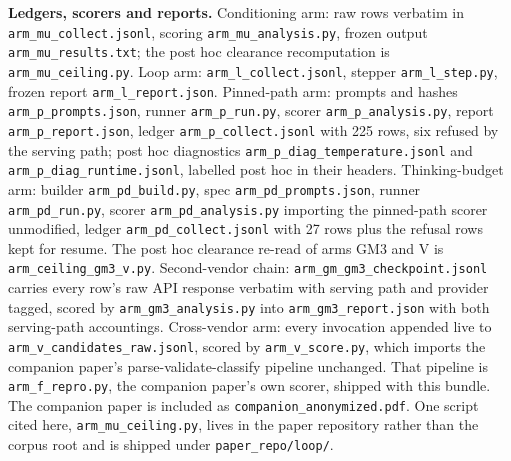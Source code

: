 \textbf{Ledgers, scorers and reports.} Conditioning arm: raw rows verbatim in
\texttt{arm\_mu\_collect.jsonl}, scoring \texttt{arm\_mu\_analysis.py}, frozen output
\texttt{arm\_mu\_results.txt}; the post hoc clearance recomputation is
\texttt{arm\_mu\_ceiling.py}. Loop arm: \texttt{arm\_l\_collect.jsonl}, stepper
\texttt{arm\_l\_step.py}, frozen report \texttt{arm\_l\_report.json}. Pinned-path arm:
prompts and hashes \texttt{arm\_p\_prompts.json}, runner \texttt{arm\_p\_run.py}, scorer
\texttt{arm\_p\_analysis.py}, report \texttt{arm\_p\_report.json}, ledger
\texttt{arm\_p\_collect.jsonl} with 225 rows, six refused by the serving path; post hoc
diagnostics \texttt{arm\_p\_diag\_temperature.jsonl} and \texttt{arm\_p\_diag\_runtime.jsonl},
labelled post hoc in their headers. Thinking-budget arm: builder
\texttt{arm\_pd\_build.py}, spec \texttt{arm\_pd\_prompts.json}, runner
\texttt{arm\_pd\_run.py}, scorer \texttt{arm\_pd\_analysis.py} importing the pinned-path
scorer unmodified, ledger \texttt{arm\_pd\_collect.jsonl} with 27 rows plus the refusal rows
kept for resume. The post hoc clearance re-read of arms GM3 and V is
\texttt{arm\_ceiling\_gm3\_v.py}. Second-vendor chain: \texttt{arm\_gm\_gm3\_checkpoint.jsonl} carries every
row's raw API response verbatim with serving path and provider tagged, scored by
\texttt{arm\_gm3\_analysis.py} into \texttt{arm\_gm3\_report.json} with both serving-path
accountings. Cross-vendor arm: every invocation appended live to
\texttt{arm\_v\_candidates\_raw.jsonl}, scored by \texttt{arm\_v\_score.py}, which imports the
companion paper's parse-validate-classify pipeline unchanged. That pipeline is
\texttt{arm\_f\_repro.py}, the companion paper's own scorer, shipped with this bundle. The
companion paper is included as \texttt{companion\_anonymized.pdf}. One script cited here,
\texttt{arm\_mu\_ceiling.py}, lives in the paper repository rather than the corpus root and is
shipped under \texttt{paper\_repo/loop/}.

